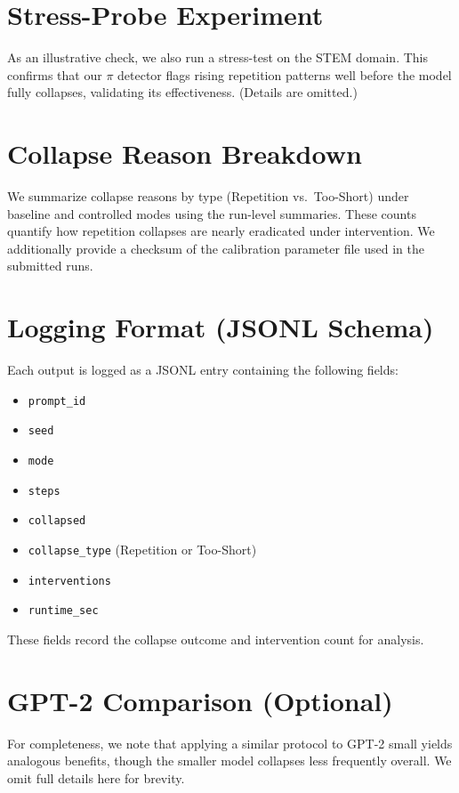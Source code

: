 \documentclass{article}
\begin{document}
\appendix

\section{Stress-Probe Experiment}
As an illustrative check, we also run a stress-test on the STEM domain. This confirms that our $\pi$ detector flags rising repetition patterns well before the model fully collapses, validating its effectiveness. (Details are omitted.)

\section{Collapse Reason Breakdown}
\label{app:reasons}
We summarize collapse reasons by type (Repetition vs.\ Too-Short) under baseline and controlled modes using the run-level summaries. These counts quantify how repetition collapses are nearly eradicated under intervention.
We additionally provide a checksum of the calibration parameter file used in the submitted runs.

\section{Logging Format (JSONL Schema)}
Each output is logged as a JSONL entry containing the following fields:
\begin{itemize}
  \item \texttt{prompt\_id}
  \item \texttt{seed}
  \item \texttt{mode}
  \item \texttt{steps}
  \item \texttt{collapsed}
  \item \texttt{collapse\_type} (Repetition or Too-Short)
  \item \texttt{interventions}
  \item \texttt{runtime\_sec}
\end{itemize}
These fields record the collapse outcome and intervention count for analysis.

\section{GPT-2 Comparison (Optional)}
For completeness, we note that applying a similar protocol to GPT-2 small yields analogous benefits, though the smaller model collapses less frequently overall. We omit full details here for brevity.
\end{document}
